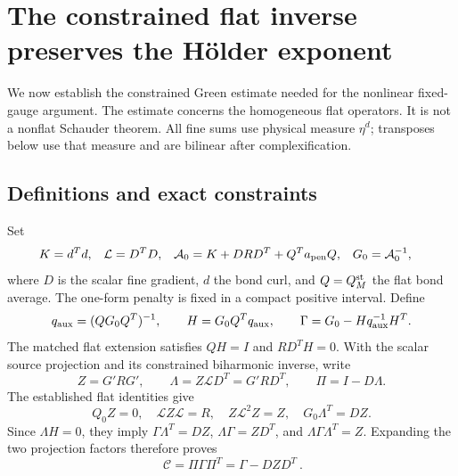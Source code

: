 
\section{The constrained flat inverse preserves the H\"older exponent}
\label{cg-section}

We now establish the constrained Green estimate needed for the
nonlinear fixed-gauge argument. The estimate concerns the
homogeneous flat operators. It is not a nonflat Schauder theorem.
All fine sums use physical measure $\eta^d$; transposes below use
that measure and are bilinear after complexification.

\subsection{Definitions and exact constraints}
\label{cg-algebra}

Set
\begin{align}
 K&=d^Td,&\mathcal L&=D^TD,&
 \mathcal A_0&=K+DRD^T+Q^Ta_{\rm pen}Q,&G_0&=\mathcal A_0^{-1},
                                                        \label{cg-flat}\end{align}
where $D$ is the scalar fine gradient, $d$ the bond curl, and
$Q=Q_M^{\rm st}$ the flat bond average. The one-form penalty is
fixed in a compact positive interval. Define
\begin{equation}\label{cg-extension}
 q_{\rm aux}=(QG_0Q^T)^{-1},\qquad
 H=G_0Q^Tq_{\rm aux},\qquad
 \Gamma=G_0-Hq_{\rm aux}^{-1}H^T.
\end{equation}
The matched flat extension satisfies $QH=I$ and $RD^TH=0$.
With the scalar source projection and its constrained biharmonic
inverse, write
\begin{equation}\label{cg-projection}
 Z=G'RG',\qquad \Lambda=Z\mathcal LD^T=G'RD^T,
 \qquad \Pi=I-D\Lambda.
\end{equation}
The established flat identities give
\begin{equation}\label{cg-scalar-identities}
 Q_0Z=0,\quad \mathcal LZ\mathcal L=R,\quad
 Z\mathcal L^2Z=Z,\quad G_0\Lambda^T=DZ.
\end{equation}
Since $\Lambda H=0$, they imply
$\Gamma\Lambda^T=DZ$,
$\Lambda\Gamma=ZD^T$, and
$\Lambda\Gamma\Lambda^T=Z$.
Expanding the two projection factors therefore proves
\begin{equation}\label{cg-constrained}
 \boxed{\ \mathcal C=\Pi\Gamma\Pi^T=\Gamma-DZD^T\ }.
\end{equation}


